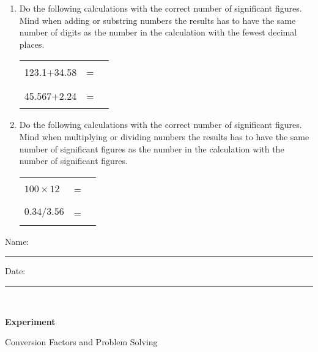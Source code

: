 \documentclass[main.tex]{subfiles}
\begin{document}
\begin{enumerate}
\begin{center}
\begin{tabular}{ p{3cm} p{1cm}p{3cm} p{3cm}    }
 \end{tabular}\end{center}



\item Do the following calculations with the correct number of significant figures. Mind when adding or substring numbers the results has to have the same number of digits as the number in the calculation with the fewest decimal places.
\begin{center} \begin{tabular}{ p{3cm} p{1cm}p{3cm}    }
  123.1+34.58 				&=&\rule{2cm}{0.4pt}      \\[0.1cm]      
   45.567+2.24 				&=&\rule{2cm}{0.4pt}      \\[0.1cm]      
 \end{tabular}\end{center}
 


\newpage \item Do the following calculations with the correct number of significant figures. Mind when multiplying or dividing numbers the results has to have the same number of significant figures as the number in the calculation with the number of significant figures.
\begin{center} \begin{tabular}{ p{3cm} p{1cm}p{3cm}    }
  $100\times 12$ 				&=&\rule{2cm}{0.4pt}      \\[0.1cm]      
   $0.34 / 3.56$ 				&=&\rule{2cm}{0.4pt}      \\[0.1cm]      
 \end{tabular}\end{center}





\end{enumerate}






\newpage\begin{multicols}{2}
\begin{tcolorbox}[enhanced jigsaw,breakable,size=title,
colback=mybrown!05,colframe=black,fonttitle=\bfseries,
title=STUDENT INFO,pad at break=1mm, break at=15cm/0pt ]
\vspace{0.2cm}
\noindent Name: \rule{5cm}{0.4pt}Date:\rule{1cm}{0.4pt}\\
\end{tcolorbox}
\end{multicols}
\hfill
\vspace{0.2cm}
\begin{center}
{\large \bfseries 
Experiment
\par
\Huge
Conversion Factors and Problem Solving
\\[5pt] \par}
\vspace{0.2cm}
\end{center}
\par
\noindent
\uline{  \hfill \normalsize \hfill       }
\end{document}
